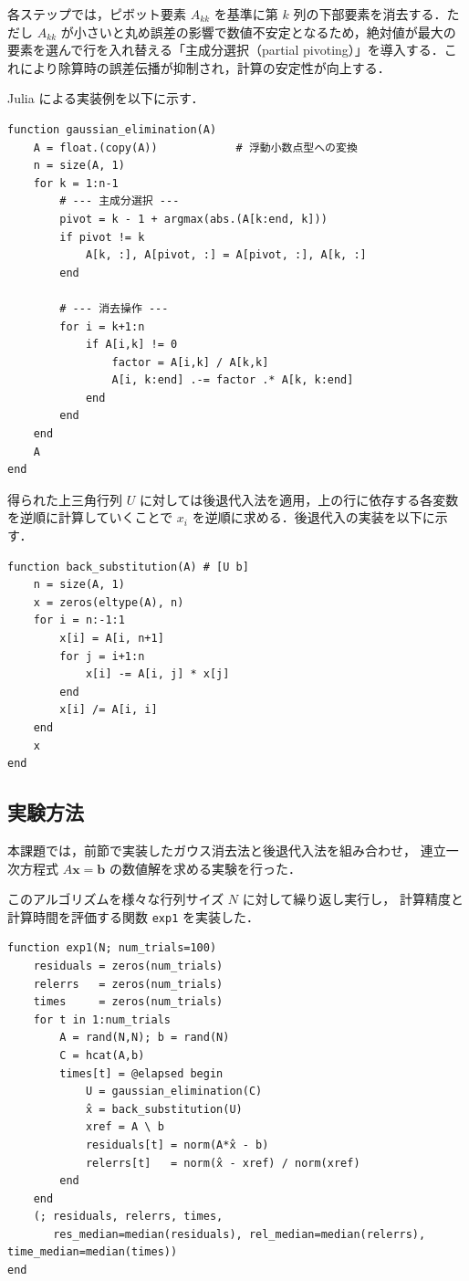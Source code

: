 \documentclass[a4paper,11pt]{ltjsarticle}
\begin{document}
各ステップでは，ピボット要素 $A_{kk}$ を基準に第 $k$ 列の下部要素を消去する．ただし $A_{kk}$ が小さいと丸め誤差の影響で数値不安定となるため，絶対値が最大の要素を選んで行を入れ替える「主成分選択（partial pivoting）」を導入する．これにより除算時の誤差伝播が抑制され，計算の安定性が向上する．

Julia による実装例を以下に示す．

\begin{verbatim}
function gaussian_elimination(A)
    A = float.(copy(A))            # 浮動小数点型への変換
    n = size(A, 1)
    for k = 1:n-1
        # --- 主成分選択 ---
        pivot = k - 1 + argmax(abs.(A[k:end, k]))
        if pivot != k
            A[k, :], A[pivot, :] = A[pivot, :], A[k, :]
        end

        # --- 消去操作 ---
        for i = k+1:n
            if A[i,k] != 0
                factor = A[i,k] / A[k,k]
                A[i, k:end] .-= factor .* A[k, k:end]
            end
        end
    end
    A
end
\end{verbatim}

得られた上三角行列 $U$ に対しては後退代入法を適用，上の行に依存する各変数を逆順に計算していくことで $x_i$ を逆順に求める．後退代入の実装を以下に示す．

\begin{verbatim}
function back_substitution(A) # [U b]
    n = size(A, 1)
    x = zeros(eltype(A), n)
    for i = n:-1:1
        x[i] = A[i, n+1]
        for j = i+1:n
            x[i] -= A[i, j] * x[j]
        end
        x[i] /= A[i, i]
    end
    x
end
\end{verbatim}



\subsection{実験方法}
本課題では，前節で実装したガウス消去法と後退代入法を組み合わせ，
連立一次方程式 $A\boldsymbol{x}=\boldsymbol{b}$ の数値解を求める実験を行った．

このアルゴリズムを様々な行列サイズ $N$ に対して繰り返し実行し，
計算精度と計算時間を評価する関数 \verb|exp1| を実装した．

\begin{verbatim}
function exp1(N; num_trials=100)
    residuals = zeros(num_trials)
    relerrs   = zeros(num_trials)
    times     = zeros(num_trials)
    for t in 1:num_trials
        A = rand(N,N); b = rand(N)
        C = hcat(A,b)
        times[t] = @elapsed begin
            U = gaussian_elimination(C)
            x̂ = back_substitution(U)
            xref = A \ b
            residuals[t] = norm(A*x̂ - b)
            relerrs[t]   = norm(x̂ - xref) / norm(xref)
        end
    end
    (; residuals, relerrs, times,
       res_median=median(residuals), rel_median=median(relerrs), time_median=median(times))
end
\end{verbatim}
\end{document}
